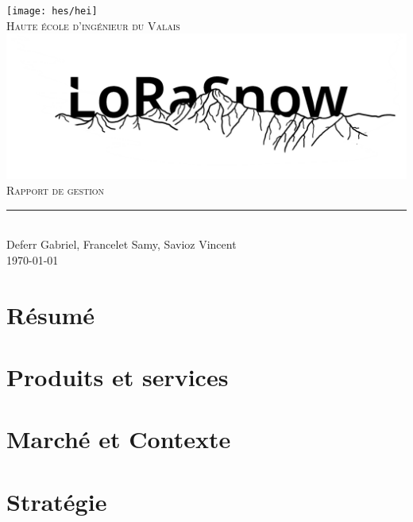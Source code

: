 \documentclass[11pt,titlepage]{report}
\begin{document}
\begin{titlepage}
	\centering
    \texttt{[image: hes/hei]}\\[0.5cm] 	%
    \textsc{\Large Haute école d'ingénieur du Valais}\\ \vspace{\fill}
	\includegraphics[width=1\linewidth]{Images/lorasnow/logo.png}\\ \vspace{\fill}
	\textsc{\LARGE Rapport de gestion}\\[0.4cm]
	\rule{\linewidth}{0.2 mm} \\[0.5 cm]
	Deferr Gabriel, Francelet Samy, Savioz Vincent \\
	\today
\end{titlepage}
\restoregeometry

\tableofcontents


\chapter{Résumé}


\chapter{Produits et services}


\chapter{Marché et Contexte}


\chapter{Stratégie}

\end{document}
